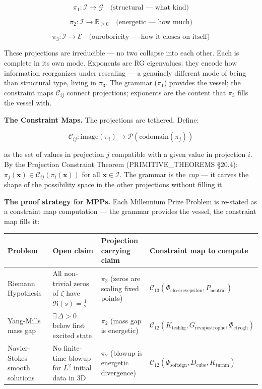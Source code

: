 \documentclass[12pt,a4paper]{article}
\newcommand{\pilcrow}{\S}
\begin{document}
\[\pi_1 : \mathcal{I} \to \mathcal{G} \quad \text{(structural --- what kind)}\]




\[\pi_2 : \mathcal{I} \to \mathbb{R}_{\geq 0} \quad \text{(energetic --- how much)}\]




\[\pi_3 : \mathcal{I} \to \mathcal{E} \quad \text{(ouroboricity --- how it closes on itself)}\]

These projections are irreducible --- no two collapse into each other. Each is complete in its own mode. Exponents are RG eigenvalues: they encode how information reorganizes under rescaling --- a genuinely different mode of being than structural type, living in $\pi_3$. The grammar ($\pi_1$) provides the vessel; the constraint maps $\mathcal{C}_{ij}$ connect projections; exponents are the content that $\pi_3$ fills the vessel with.

\textbf{The Constraint Maps.} The projections are tethered. Define:

\[\mathcal{C}_{ij} : \mathrm{image}(\pi_i) \to \mathcal{P}(\mathrm{codomain}(\pi_j))\]

as the set of values in projection $j$ compatible with a given value in projection $i$. By the Projection Constraint Theorem (PRIMITIVE\_THEOREMS \pilcrow{}20.4): $\pi_j(\mathbf{x}) \in \mathcal{C}_{ij}(\pi_i(\mathbf{x}))$ for all $\mathbf{x} \in \mathcal{I}$. The grammar is the \emph{cup} --- it carves the shape of the possibility space in the other projections without filling it.

\textbf{The proof strategy for MPPs.} Each Millennium Prize Problem is re-stated as a constraint map computation --- the grammar provides the vessel, the constraint map fills it:

\begin{table}[htbp]
\centering
\small
{}
\begin{tabularx}{\textwidth}{>{\centering\arraybackslash}X >{\centering\arraybackslash}X >{\centering\arraybackslash}X >{\centering\arraybackslash}X}
\toprule
\rowcolor{gray!25}\textbf{Problem} & \textbf{Open claim} & \textbf{Projection carrying claim} & \textbf{Constraint map to compute} \\
\midrule
\rowcolors{1}{white}{gray!10}
Riemann Hypothesis & All non-trivial zeros of $\zeta$ have $\Re(s) = \frac{1}{2}$ & $\pi_3$ (zeros are scaling fixed points) & $\mathcal{C}_{13}(\Phi_{\text{closerevepsilon}}, P_\text{neutral})$ \\
Yang-Mills mass gap & $\exists\, \Delta > 0$ below first excited state & $\pi_2$ (mass gap is energetic) & $\mathcal{C}_{12}(K_{\text{teshlig}}, G_{\text{revapostrophe}}, \Phi_{\text{ctyogh}})$ \\
Navier-Stokes smooth solutions & No finite-time blowup for $L^2$ initial data in 3D & $\pi_2$ (blowup is energetic divergence) & $\mathcal{C}_{12}(\Phi_{\text{softsign}}, D_\text{cube}, K_{\text{turnm}})$ \\
\bottomrule
\end{tabularx}
\end{table}
\end{document}
